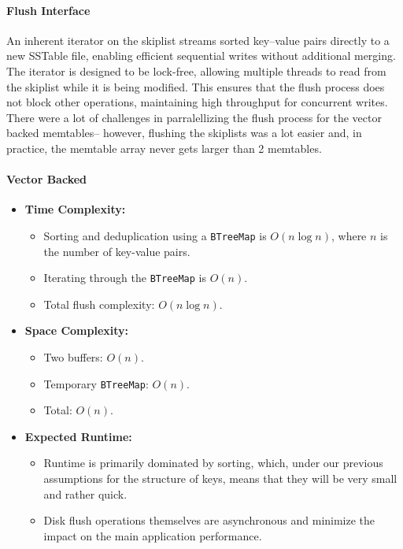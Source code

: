 \documentclass[10pt]{article}
\begin{document}
\paragraph{Flush Interface}
An inherent iterator on the skiplist streams sorted key–value pairs directly to a new SSTable file, enabling efficient sequential writes without additional merging.
The iterator is designed to be lock-free, allowing multiple threads to read from the skiplist while it is being modified. This ensures that the flush process does not block other operations, maintaining high throughput for concurrent writes.
There were a lot of challenges in parralellizing the flush process for the vector backed memtables-- however, flushing the skiplists was a lot easier and, in practice, the memtable array never gets larger than 2 memtables.

\paragraph{Vector Backed}
\begin{itemize}[leftmargin=1em,itemsep=0.25ex,parsep=0ex]
  \item \textbf{Time Complexity:}
  \begin{itemize}[leftmargin=1em,itemsep=0.25ex,parsep=0ex]
    \item Sorting and deduplication using a \texttt{BTreeMap} is $O(n \log n)$, where $n$ is the number of key-value pairs.
    \item Iterating through the \texttt{BTreeMap} is $O(n)$.
    \item Total flush complexity: $O(n \log n)$.
  \end{itemize}
  \item \textbf{Space Complexity:}
  \begin{itemize}[leftmargin=1em,itemsep=0.25ex,parsep=0ex]
    \item Two buffers: $O(n)$.
    \item Temporary \texttt{BTreeMap}: $O(n)$.
    \item Total: $O(n)$.
  \end{itemize}
  \item \textbf{Expected Runtime:}
  \begin{itemize}[leftmargin=1em,itemsep=0.25ex,parsep=0ex]
    \item Runtime is primarily dominated by sorting, which, under our previous assumptions for the structure of keys, means that they will be very small and rather quick.
    \item Disk flush operations themselves are asynchronous and minimize the impact on the main application performance.
  \end{itemize}
\end{itemize}
\end{document}
